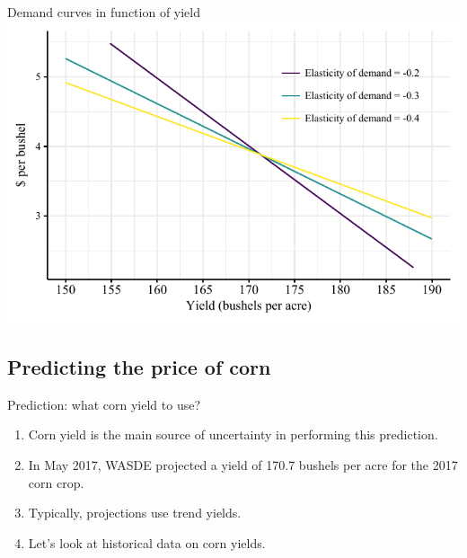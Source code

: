 \documentclass[table,xcolor=pdftex,dvipsnames, handout]{beamer}\usepackage[]{graphicx}\usepackage[]{color}
\makeatletter
\def\maxwidth{ %
  \ifdim\Gin@nat@width>\linewidth
    \linewidth
  \else
    \Gin@nat@width
  \fi
}
\newenvironment{knitrout}{}{} %
\makeatother
\begin{document}
\begin{frame}{Demand curves in function of yield}
\begin{knitrout}
\color{fgcolor}
\includegraphics[width=\maxwidth]{figure/figure_demand2-1} 

\end{knitrout}
\end{frame}



\subsection{Predicting the price of corn}

\begin{frame}{Prediction: what corn yield to use?}
\begin{enumerate}[label=\textbullet]
  \item Corn yield is the main source of uncertainty in performing this prediction.
  \item In May 2017, WASDE projected a yield of 170.7 bushels per acre for the 2017 corn crop.
  \item Typically, projections use trend yields.
  \item Let's look at historical data on corn yields.
\end{enumerate}
\end{frame}

\end{document}

